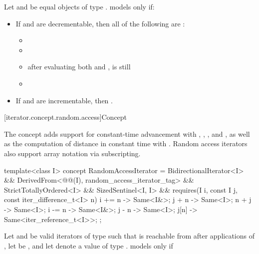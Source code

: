 \pnum
Let  and  be equal objects of type .
 models  only if:

\begin{itemize}
\item If  and  are decrementable,
  then all of the following are :
  \begin{itemize}
  \item {}
  \item {}
  \item after evaluating both  and ,
     is still 
  \item {}
  \end{itemize}
  \item If  and  are incrementable, then
    .
\end{itemize}

[iterator.concept.random.access]{Concept }

\pnum
The  concept adds support for
constant-time advancement with \tcode{+=}, \tcode{+}, \tcode{-=}, and \tcode{-},
as well as the computation of distance in constant time with \tcode{-}.
Random access iterators also support array notation via subscripting.

%
\begin{codeblock}
template<class I>
  concept RandomAccessIterator =
    BidirectionalIterator<I> &&
    DerivedFrom<@@(I), random_access_iterator_tag> &&
    StrictTotallyOrdered<I> &&
    SizedSentinel<I, I> &&
    requires(I i, const I j, const iter_difference_t<I> n) {
      { i += n } -> Same<I&>;
      { j +  n } -> Same<I>;
      { n +  j } -> Same<I>;
      { i -= n } -> Same<I&>;
      { j -  n } -> Same<I>;
      {  j[n]  } -> Same<iter_reference_t<I>>;
    };
\end{codeblock}

\pnum
Let  and  be valid iterators of type 
such that  is reachable from 
after  applications of ,
let  be ,
and let  denote a value of type .
 models  only if

